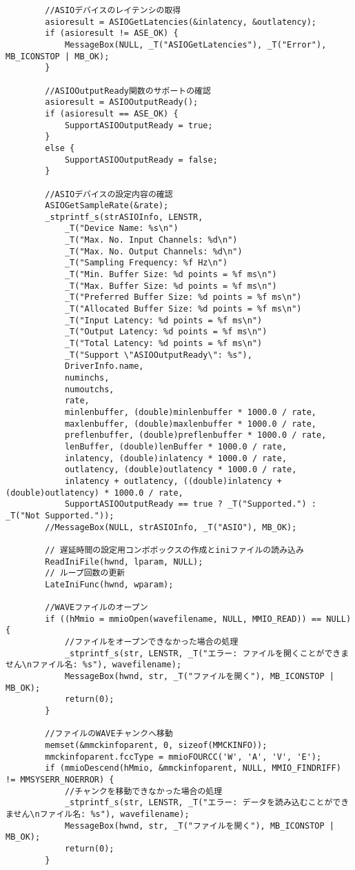 \begin{verbatim}
		//ASIOデバイスのレイテンシの取得
		asioresult = ASIOGetLatencies(&inlatency, &outlatency);
		if (asioresult != ASE_OK) {
			MessageBox(NULL, _T("ASIOGetLatencies"), _T("Error"), MB_ICONSTOP | MB_OK);
		}

		//ASIOOutputReady関数のサポートの確認
		asioresult = ASIOOutputReady();
		if (asioresult == ASE_OK) {
			SupportASIOOutputReady = true;
		}
		else {
			SupportASIOOutputReady = false;
		}

		//ASIOデバイスの設定内容の確認
		ASIOGetSampleRate(&rate);
		_stprintf_s(strASIOInfo, LENSTR,
			_T("Device Name: %s\n")
			_T("Max. No. Input Channels: %d\n")
			_T("Max. No. Output Channels: %d\n")
			_T("Sampling Frequency: %f Hz\n")
			_T("Min. Buffer Size: %d points = %f ms\n")
			_T("Max. Buffer Size: %d points = %f ms\n")
			_T("Preferred Buffer Size: %d points = %f ms\n")
			_T("Allocated Buffer Size: %d points = %f ms\n")
			_T("Input Latency: %d points = %f ms\n")
			_T("Output Latency: %d points = %f ms\n")
			_T("Total Latency: %d points = %f ms\n")
			_T("Support \"ASIOOutputReady\": %s"),
			DriverInfo.name,
			numinchs,
			numoutchs,
			rate,
			minlenbuffer, (double)minlenbuffer * 1000.0 / rate,
			maxlenbuffer, (double)maxlenbuffer * 1000.0 / rate,
			preflenbuffer, (double)preflenbuffer * 1000.0 / rate,
			lenBuffer, (double)lenBuffer * 1000.0 / rate,
			inlatency, (double)inlatency * 1000.0 / rate,
			outlatency, (double)outlatency * 1000.0 / rate,
			inlatency + outlatency, ((double)inlatency + (double)outlatency) * 1000.0 / rate,
			SupportASIOOutputReady == true ? _T("Supported.") : _T("Not Supported."));
		//MessageBox(NULL, strASIOInfo, _T("ASIO"), MB_OK);

		// 遅延時間の設定用コンボボックスの作成とiniファイルの読み込み
		ReadIniFile(hwnd, lparam, NULL);
		// ループ回数の更新
		LateIniFunc(hwnd, wparam);

		//WAVEファイルのオープン
		if ((hMmio = mmioOpen(wavefilename, NULL, MMIO_READ)) == NULL) {
			//ファイルをオープンできなかった場合の処理
			_stprintf_s(str, LENSTR, _T("エラー: ファイルを開くことができません\nファイル名: %s"), wavefilename);
			MessageBox(hwnd, str, _T("ファイルを開く"), MB_ICONSTOP | MB_OK);
			return(0);
		}

		//ファイルのWAVEチャンクへ移動
		memset(&mmckinfoparent, 0, sizeof(MMCKINFO));
		mmckinfoparent.fccType = mmioFOURCC('W', 'A', 'V', 'E');
		if (mmioDescend(hMmio, &mmckinfoparent, NULL, MMIO_FINDRIFF) != MMSYSERR_NOERROR) {
			//チャンクを移動できなかった場合の処理
			_stprintf_s(str, LENSTR, _T("エラー: データを読み込むことができません\nファイル名: %s"), wavefilename);
			MessageBox(hwnd, str, _T("ファイルを開く"), MB_ICONSTOP | MB_OK);
			return(0);
		}


\end{verbatim}
